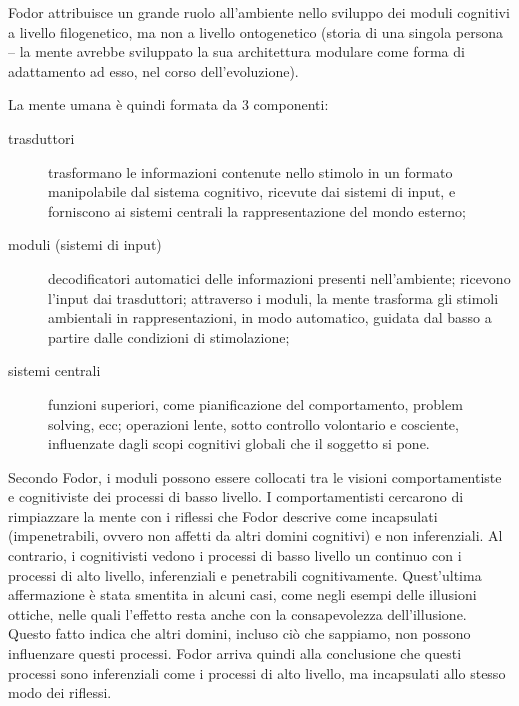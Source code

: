 Fodor attribuisce un grande ruolo all'ambiente nello sviluppo dei moduli cognitivi a livello filogenetico, ma non a livello ontogenetico (storia di una singola persona – la mente avrebbe sviluppato la sua architettura modulare come forma di adattamento ad esso, nel corso dell'evoluzione).

La mente umana è quindi formata da 3 componenti:

\begin{description}
	\item [trasduttori] trasformano le informazioni contenute nello stimolo in un formato manipolabile dal sistema cognitivo, ricevute dai sistemi di input, e forniscono ai sistemi centrali la rappresentazione del mondo esterno;
	\item [moduli (sistemi di input)] decodificatori automatici delle informazioni presenti nell'ambiente; ricevono l'input dai trasduttori; attraverso i moduli, la mente trasforma gli stimoli ambientali in rappresentazioni, in modo automatico, guidata dal basso a partire dalle condizioni di stimolazione;
	\item [sistemi centrali] funzioni superiori, come pianificazione del comportamento, problem solving, ecc; operazioni lente, sotto controllo volontario e cosciente, influenzate dagli scopi cognitivi globali che il soggetto si pone.
\end{description}
 
Secondo Fodor, i moduli possono essere collocati tra le visioni comportamentiste e cognitiviste dei processi di basso livello. I comportamentisti cercarono di rimpiazzare la mente con i riflessi che Fodor descrive come incapsulati (impenetrabili, ovvero non affetti da altri domini cognitivi) e non inferenziali. Al contrario, i cognitivisti vedono i processi di basso livello un continuo con i processi di alto livello, inferenziali e penetrabili cognitivamente. Quest’ultima affermazione è stata smentita in alcuni casi, come negli esempi delle illusioni ottiche, nelle quali l’effetto resta anche con la consapevolezza dell’illusione. Questo fatto indica che altri domini, incluso ciò che sappiamo, non possono influenzare questi processi. Fodor arriva quindi alla conclusione che questi processi sono inferenziali come i processi di alto livello, ma incapsulati allo stesso modo dei riflessi.

